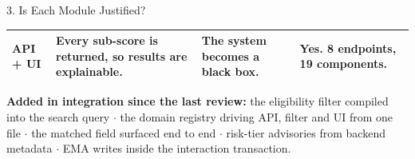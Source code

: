 \documentclass[aspectratio=169, 11pt]{beamer}
\begin{document}
\begin{frame}[shrink]{3. Is Each Module Justified?}
\begin{center}
{\begin{tabular}{L{1.45cm} L{3.05cm} L{2.85cm} L{3.35cm}}
API + UI        & Every sub-score is returned, so results are explainable.         & The system becomes a black box.                  & \textbf{Yes.} 8 endpoints, 19 components.\\
\bottomrule
\end{tabular}}
\end{center}
\vspace{1mm}
{\tiny\textbf{Added in integration since the last review:} the eligibility filter compiled into the
search query $\cdot$ the domain registry driving API, filter and UI from one file $\cdot$ the matched
field surfaced end to end $\cdot$ risk-tier advisories from backend metadata $\cdot$ EMA writes inside
the interaction transaction.}
\end{frame}

\end{document}

